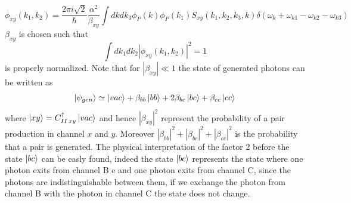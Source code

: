 \begin{equation}\label{biphoton}\phi_{xy}(k_1,k_2) = \frac{2\pi i \sqrt{2}}{\hbar} \frac{\alpha^2}{\beta_{xy}}\int dk dk_3\phi_P(k)\phi_P(k_1)S_{xy}(k_1,k_2,k_3,k)\delta(\omega_{k}+\omega_{k1}-\omega_{k2}-\omega_{k3}) \end{equation}
$\beta_{xy}$ is chosen such that
\begin{equation}\int dk_1 dk_2 |\phi_{xy}(k_1,k_2)|^2 = 1\end{equation}
is properly normalized. Note that for $|\beta_{xy}| \ll 1 $ the state of generated photons can be written as
\begin{equation}\ket{\psi_{gen}} \simeq \ket{vac} + \beta_{bb}\ket{bb}+2\beta_{bc}\ket{bc}+ \beta_{cc}\ket{cc} \end{equation}
where $\ket{xy} = C_{II\, xy}^\dagger\ket{vac}$ and hence $|\beta_{xy}|^2$ represent the probability of a pair production in channel $x$ and $y$. Moreover
$|\beta_{bb}|^2 + |\beta_{bc}|^2 +|\beta_{cc}|^2$ is the probability that a pair is generated. The physical interpretation of the factor 2 before the state $\ket{bc}$ can be easly found, indeed the state $\ket{bc}$ represents the state where one photon exits from channel B e and one photon exits from channel C, since the photons are indistinguishable between them, if we exchange the photon from channel B with the photon in channel C the state does not change.

